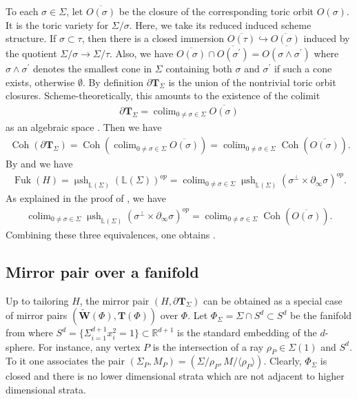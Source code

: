 \documentclass[a4paper,12pt, twoside, pdftex]{amsart}
\theoremstyle{definition}
\numberwithin{equation}{section}
\newcommand{\pref}{\prettyref}
\newcommand{\colim}{\operatorname{colim}}
\newcommand{\Coh}{\operatorname{Coh}}
\newcommand{\del}{\partial}
\newcommand{\Fuk}{\operatorname{Fuk}}
\newcommand{\msh}{\operatorname{\mu sh}}
\newcommand{\bL}{\mathbb{L}}
\newcommand{\bR}{\mathbb{R}}
\newcommand{\bfT}{\mathbf{T}}
\newcommand{\bfW}{\mathbf{W}}
\begin{document}
To each
$\sigma \in \Sigma$,
let
$\overline{O(\sigma)}$
be the closure of the corresponding toric orbit
$O(\sigma)$.
It is the toric variety for
$\Sigma / \sigma$.
Here,
we take its reduced induced scheme structure.
If
$\sigma \subset \tau$,
then there is a closed immersion
$\overline{O(\tau)}
\hookrightarrow
\overline{O(\sigma)}$
induced by the quotient
$\Sigma / \sigma
\to
\Sigma / \tau$.
Also,
we have
$\overline{O(\sigma)}
\cap
\overline{O(\sigma^\prime)}
=
\overline{O(\sigma \wedge \sigma^\prime)}$
where
$\sigma \wedge \sigma^\prime$
denotes the smallest cone in
$\Sigma$
containing both
$\sigma$
and
$\sigma^\prime$
if such a cone exists,
otherwise
$\emptyset$.
By definition
$\del \bfT_\Sigma$
is the union of the nontrivial toric orbit closures.
Scheme-theoretically,
this amounts to the existence of the colimit
\begin{align} \label{eq:5.3}
\del \bfT_\Sigma
=
\colim_{0 \neq \sigma \in \Sigma}\overline{O(\sigma)}
\end{align}
as an algebraic space
\cite[Lemma 3.5]{GS2}.
Then we have
\begin{align*}
\Coh(\del \bfT_\Sigma)
=
\Coh(\colim_{0 \neq \sigma \in \Sigma}\overline{O(\sigma)})
=
\colim_{0 \neq \sigma \in \Sigma}\Coh(\overline{O(\sigma)}).
\end{align*}
By
\cite[Theorem 1.4]{GPS3}
and
\cite[Corollary 4.8]{GS2}
we have
\begin{align*}
\Fuk(H)
=
\msh_{\bL(\Sigma)}(\bL(\Sigma))^{op}
=
\colim_{0 \neq \sigma \in \Sigma} \msh_{\bL(\Sigma)}(\sigma^\perp \times \del_\infty \sigma)^{op}.
\end{align*}
As explained in the proof of
\cite[Theorem 7.13]{GS2},
we have 
\begin{align*}
\colim_{0 \neq \sigma \in \Sigma} \msh_{\bL(\Sigma)}(\sigma^\perp \times \del_\infty \sigma)^{op}
=
\colim_{0 \neq \sigma \in \Sigma}\Coh(\overline{O(\sigma)}).
\end{align*}
Combining these three equivalences,
one obtains
\pref{eq:GS}.

\subsection{Mirror pair over a fanifold}
Up to tailoring
$H$,
the mirror pair
$(H, \del \bfT_\Sigma)$
can be obtained as a special case of mirror pairs
$(\widetilde{\bfW}(\Phi), \bfT(\Phi))$
over
$\Phi$.
Let
$\Phi_\Sigma
=
\Sigma \cap S^d
\subset
S^d$
be the fanifold from
\cite[Example 2.11, 4.23]{GS1}
where
$S^d
=
\{ \Sigma^{d+1}_{i = 1} x^2_i = 1 \}
\subset
\bR^{d+1}$
is the standard embedding of the $d$-sphere.
For instance,
any vertex
$P$
is the intersection of a ray
$\rho_P \in \Sigma(1)$
and
$S^d$.
To it one associates the pair
$(\Sigma_P, M_P)
=
(\Sigma / \rho_P, M / \langle \rho_P \rangle)$.
Clearly,
$\Phi_\Sigma$
is closed
and
there is no lower dimensional strata
which are not adjacent to higher dimensional strata.
\end{document}
